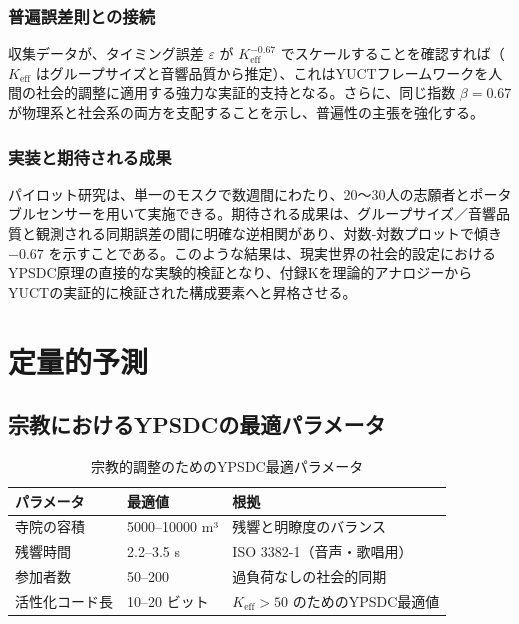 \documentclass[12pt,a4paper]{article}
\newcommand{\Keff}{K_{\mathrm{eff}}}
\begin{document}
	\subsubsection{普遍誤差則との接続}
	収集データが、タイミング誤差 $\varepsilon$ が $\Keff^{-0.67}$ でスケールすることを確認すれば（$\Keff$ はグループサイズと音響品質から推定）、これはYUCTフレームワークを人間の社会的調整に適用する強力な実証的支持となる。さらに、同じ指数 $\beta=0.67$ が物理系と社会系の両方を支配することを示し、普遍性の主張を強化する。
	
	\subsubsection{実装と期待される成果}
	パイロット研究は、単一のモスクで数週間にわたり、20～30人の志願者とポータブルセンサーを用いて実施できる。期待される成果は、グループサイズ／音響品質と観測される同期誤差の間に明確な逆相関があり、対数‐対数プロットで傾き $-0.67$ を示すことである。このような結果は、現実世界の社会的設定におけるYPSDC原理の直接的な実験的検証となり、付録Kを理論的アナロジーからYUCTの実証的に検証された構成要素へと昇格させる。
	
	\section{定量的予測}
	
	\subsection{宗教におけるYPSDCの最適パラメータ}
	
	\begin{table}[h]
		\centering
		\begin{tabular}{p{}p{}p{}}
			\toprule
			\textbf{パラメータ} & \textbf{最適値} & \textbf{根拠} \\
			\midrule
			寺院の容積 & 5000–10000 m³ & 残響と明瞭度のバランス \\
			残響時間 & 2.2–3.5 s & ISO 3382-1（音声・歌唱用） \\
			参加者数 & 50–200 & 過負荷なしの社会的同期 \\
			活性化コード長 & 10–20 ビット & $K_{\mathrm{eff}} > 50$ のためのYPSDC最適値 \\
			\bottomrule
		\end{tabular}
		\caption{宗教的調整のためのYPSDC最適パラメータ}
		\label{tab:optimal-params}
	\end{table}
	
\end{document}
